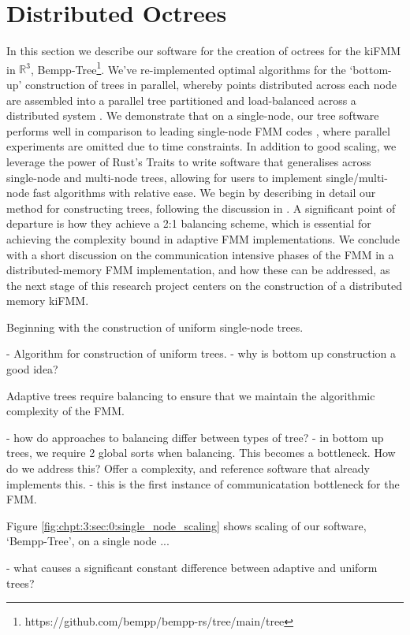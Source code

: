 \section{Distributed Octrees}

In this section we describe our software for the creation of octrees for the kiFMM in $\mathbb{R}^3$, Bempp-Tree\footnote{https://github.com/bempp/bempp-rs/tree/main/tree}. We've re-implemented optimal algorithms for the `bottom-up' construction of trees in parallel, whereby points distributed across each node are assembled into a parallel tree partitioned and load-balanced across a distributed system \cite{sundar2008bottom}. We demonstrate that on a single-node, our tree software performs well in comparison to leading single-node FMM codes \cite{wang2021exafmm}, where parallel experiments are omitted due to time constraints. In addition to good scaling, we leverage the power of Rust's Traits to write software that generalises across single-node and multi-node trees, allowing for users to implement single/multi-node fast algorithms with relative ease. We begin by describing in detail our method for constructing trees, following the discussion in \cite{sundar2008bottom}. A significant point of departure is how they achieve a 2:1 balancing scheme, which is essential for achieving the complexity bound in adaptive FMM implementations. We conclude with a short discussion on the communication intensive phases of the FMM in a distributed-memory FMM implementation, and how these can be addressed, as the next stage of this research project centers on the construction of a distributed memory kiFMM.

Beginning with the construction of uniform single-node trees.

- Algorithm for construction of uniform trees.
- why is bottom up construction a good idea?


Adaptive trees require balancing to ensure that we maintain the algorithmic complexity of the FMM.

- how do approaches to balancing differ between types of tree?
- in bottom up trees, we require 2 global sorts when balancing. This becomes a bottleneck. How do we address this? Offer a complexity, and reference software that already implements this.
- this is the first instance of communicatation bottleneck for the FMM.

Figure \ref{fig:chpt:3:sec:0:single_node_scaling} shows scaling of our software, `Bempp-Tree', on a single node ...

- what causes a significant constant difference between adaptive and uniform trees?

